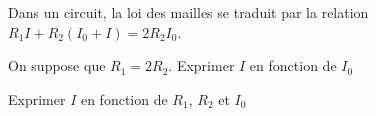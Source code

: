





\hauteurLargeurCadreReponse		{7mm}{50mm}
\initialisationEntrainement

Dans un circuit, la loi des mailles se traduit par la relation $R_1I+R_2(I_0+I)=2R_2 I_0$.

\debutEntrainement


\begin{enonce}
	On suppose que $R_1 = 2R_2$. Exprimer $I$ en fonction de $I_0$
\end{enonce}


%



\begin{enonce}
	Exprimer $I$ en fonction de $R_1$, $R_2$ et $I_0$
\end{enonce}

